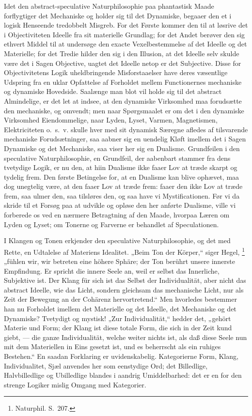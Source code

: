 \documentclass[12pt]{book}
\newcommand{\opage}[1]{\marginnote{\footnotesize\textit{[#1]}}}
\begin{document}
Idet den abstract-speculative Naturphilosophie paa phantastisk Maade forflygtiger det
Mechaniske og holder sig til det Dynamiske, begaaer den et i logisk Henseende tredobbelt
Misgreb. For det Første kommer den til at løsrive det i Objectiviteten Ideelle fra sit
materielle Grundlag; for det Andet berøver den sig ethvert Middel til at undersøge den
exacte Vexelbestemmelse af det Ideelle og det Materielle; for det Tredie hilder den sig i
den Illusion, at det Ideelle selv skulde være det i Sagen Objective, uagtet det Ideelle
netop er det Subjective. Disse for Objectivitetens Logik uheldbringende Misforstaaelser have
deres væsentlige Udspring fra en uklar
\opage{370} Opfattelse af Forholdet mellem Functionernes mechaniske og dynamiske Hovedside. Saalænge man
blot vil holde sig til det abstract Almindelige, er det let at indsee, at den dynamiske
Virksomhed maa forudsætte den mechaniske, og omvendt; men naar Spørgsmaalet er om det i den
dynamiske Virksomhed Eiendommelige, naar Lyden, Lyset, Varmen, Magnetismen, Elektriciteten
o.\ s.\ v. skulle hver med sit dynamisk Særegne afledes af tilsvarende mechaniske
Forudsætninger, saa aabner sig en uendelig Kløft imellem det i Sagen Dynamiske og det
Mechaniske, saa viser her sig en Dualisme. Grundfeilen i den speculative Naturphilosophie,
en Grundfeil, der aabenbart stammer fra dens tvetydige Logik, er nu den, at hiin Dualisme
ikke faaer Lov at træde skarpt og tydelig frem. Den første Betingelse for, at en Dualisme
kan blive ophævet, maa dog unegtelig være, at den faaer Lov at træde frem: faaer den ikke
Lov at træde frem, saa ulmer den, saa tilsløres den, og saa have vi Mystificationen. Før vi
da skride til et Forsøg paa at udvikle og opløse den her anførte Dualisme, ville vi forberede
os ved en nærmere Betragtning af den Maade, hvorpaa Læren om Lyden og Lyset; om Tonerne og
Farverne er behandlet af Speculationen.

I Klangen og Tonen erkjender den speculative Naturphilosophie, og det med Rette, en Udtalelse
af Materiens Idealitet. „Beim Ton der Körper,“ siger Hegel,%
\footnote{Naturphil. S.~207.}
„fühlen wir, wir betreten eine höhere Sphäre; der Ton berührt unsere innerste Empfindung. Er
spricht die innere Seele an, weil er selbst das Innerliche, Subjektive ist. Der Klang für
sich ist das Selbst der Individualität, aber nicht das abstract Ideelle, wie das Licht,
sondern gleichsam das mechanische Licht, nur als Zeit der Bewegung an der Cohärenz
hervortretend.“ Men hvorledes bestemmer han nu Forholdet imellem det Materielle og det
Ideelle, det Mechaniske og det Dynamiske?
\opage{371} Tvetydigt og mystisk! „Zur Individualität,“ hedder det, „gehört Materie und Form; der Klang
ist diese totale Form, die sich in der Zeit kund giebt, — die ganze Individualität, welche
weiter nichts ist, als daß diese Seele nun mit dem Materiellen in Eins gesetzt ist, und es
beherrscht als ein ruhiges Bestehen.“ En saadan Forklaring er uvidenskabelig. Kategorierne
Form, Klang, Individualitet, Sjæl anvendes her som eenstydige Ord; det Billedlige,
Halvbilledlige og Ubilledlige blandes i aandrig Umiddelbarhed: det er en for den strenge
Logiker mislig Omgang med Kategorier.
\end{document}
